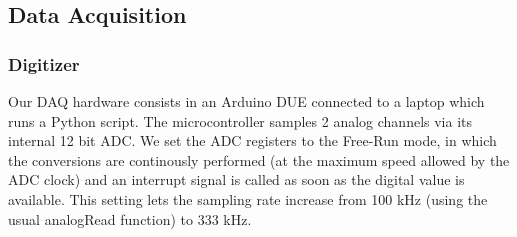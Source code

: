 \documentclass[12pt]{article}
\begin{document}
\subsection{Data Acquisition}
\subsubsection{Digitizer}
Our DAQ hardware consists in an Arduino DUE connected to a laptop which runs a Python script. The microcontroller samples 2 analog channels via its internal 12 bit ADC. We set the ADC registers to the Free-Run mode, in which the conversions are continously performed (at the maximum speed allowed by the ADC clock) and an interrupt signal is called as soon as the digital value is available. This setting lets the sampling rate increase from 100 kHz (using the usual analogRead function) to 333 kHz.
\end{document}
